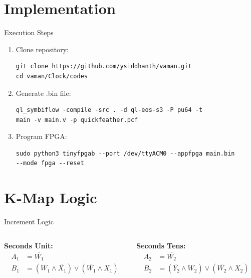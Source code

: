 \documentclass{beamer}
\begin{document}
\section{Implementation}
\begin{frame}[fragile]{Execution Steps}
    \begin{enumerate}
        \item Clone repository:
        
        \begin{lstlisting}[basicstyle=\ttfamily\small]
git clone https://github.com/ysiddhanth/vaman.git
cd vaman/Clock/codes
        \end{lstlisting}
        
        \item Generate .bin file:
        
        \begin{lstlisting}[basicstyle=\ttfamily\scriptsize]
ql_symbiflow -compile -src . -d ql-eos-s3 -P pu64 -t 
main -v main.v -p quickfeather.pcf
        \end{lstlisting}
        
        \item Program FPGA:
        
        \begin{lstlisting}[basicstyle=\ttfamily\scriptsize]
sudo python3 tinyfpgab --port /dev/ttyACM0 --appfpga main.bin 
--mode fpga --reset
        \end{lstlisting}
    \end{enumerate}
\end{frame}

\section{K-Map Logic}
\begin{frame}{Increment Logic}
    \begin{columns}
        \begin{column}{0.5\textwidth}
            \textbf{Seconds Unit:}
            \begin{align*}
                A_1 &= \overline{W_1} \\
                B_1 &= (W_1 \land \overline{X_1}) \lor (\overline{W_1} \land X_1)
            \end{align*}
        \end{column}
        \begin{column}{0.5\textwidth}
            \textbf{Seconds Tens:}
            \begin{align*}
                A_2 &= \overline{W_2} \\
                B_2 &= (\overline{Y_2} \land W_2) \lor (\overline{W_2} \land X_2)
            \end{align*}
        \end{column}
    \end{columns}
\end{frame}
\end{document}
